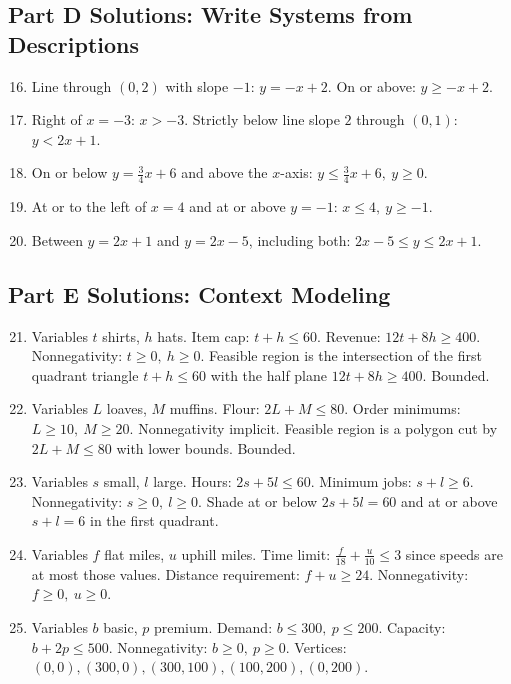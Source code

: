 \documentclass[14pt]{extarticle}
\begin{document}
\subsection*{Part D Solutions: Write Systems from Descriptions}
\begin{enumerate}
  \setcounter{enumi}{15}
  \item Line through \((0,2)\) with slope \(-1\): \(y=-x+2\). On or above: \(y\ge -x+2\).
  \item Right of \(x=-3\): \(x>-3\). Strictly below line slope \(2\) through \((0,1)\): \(y<2x+1\).
  \item On or below \(y=\tfrac34 x+6\) and above the \(x\)-axis: \(y\le \tfrac34 x+6,\ y\ge 0\).
  \item At or to the left of \(x=4\) and at or above \(y=-1\): \(x\le4,\ y\ge-1\).
  \item Between \(y=2x+1\) and \(y=2x-5\), including both: \(2x-5 \le y \le 2x+1\).
\end{enumerate}

\subsection*{Part E Solutions: Context Modeling}
\begin{enumerate}
  \setcounter{enumi}{20}
  \item Variables \(t\) shirts, \(h\) hats.  
  Item cap: \(t+h\le60\). Revenue: \(12t+8h\ge400\). Nonnegativity: \(t\ge0,\ h\ge0\).  
  Feasible region is the intersection of the first quadrant triangle \(t+h\le60\) with the half plane \(12t+8h\ge400\). Bounded.

  \item Variables \(L\) loaves, \(M\) muffins.  
  Flour: \(2L+M\le80\). Order minimums: \(L\ge10,\ M\ge20\).  
  Nonnegativity implicit. Feasible region is a polygon cut by \(2L+M\le80\) with lower bounds. Bounded.

  \item Variables \(s\) small, \(l\) large.  
  Hours: \(2s+5l\le60\). Minimum jobs: \(s+l\ge6\). Nonnegativity: \(s\ge0,\ l\ge0\).  
  Shade at or below \(2s+5l=60\) and at or above \(s+l=6\) in the first quadrant.

  \item Variables \(f\) flat miles, \(u\) uphill miles.  
  Time limit: \( \frac{f}{18} + \frac{u}{10} \le 3\) since speeds are at most those values.  
  Distance requirement: \(f+u\ge24\). Nonnegativity: \(f\ge0,\ u\ge0\).

  \item Variables \(b\) basic, \(p\) premium.  
  Demand: \(b\le300,\ p\le200\). Capacity: \(b+2p\le500\). Nonnegativity: \(b\ge0,\ p\ge0\).  
  Vertices: \((0,0), (300,0), (300,100), (100,200), (0,200)\).
\end{enumerate}





\end{document}
